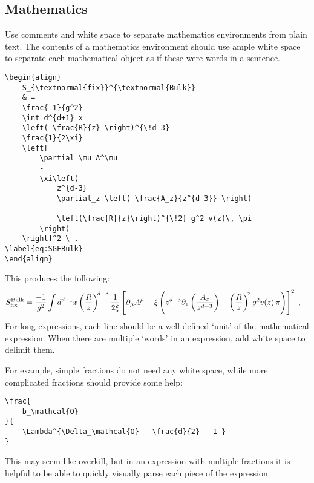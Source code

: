 \subsection{Mathematics}

Use comments and white space to separate mathematics environments from plain text.
% 
The contents of a mathematics environment should use ample white space to separate each mathematical object as if these were words in a sentence.
% 
\begin{lstlisting}[style=latexstyle]
\begin{align}
	S_{\textnormal{fix}}^{\textnormal{Bulk}}
	& =
	\frac{-1}{g^2} 
	\int d^{d+1} x  
	\left( \frac{R}{z} \right)^{\!d-3}
	\frac{1}{2\xi}
	\left[
	    \partial_\mu A^\mu
	    -
	    \xi\left( 
	        z^{d-3} 
	        \partial_z \left( \frac{A_z}{z^{d-3}} \right)
	        -
	        \left(\frac{R}{z}\right)^{\!2} g^2 v(z)\, \pi
	    \right)
	\right]^2 \ ,
\label{eq:SGFBulk}
\end{align}
\end{lstlisting}
% 
This produces the following:
\begin{align}
	S_{\textnormal{fix}}^{\textnormal{Bulk}}
	& =
	\frac{-1}{g^2} 
	\int d^{d+1} x  
	\left( \frac{R}{z} \right)^{\!d-3}\frac{1}{2\xi}
	\left[
	    \partial_\mu A^\mu
	    -
	    \xi\left( 
	        z^{d-3} \partial_z \left(\frac{A_z}{z^{d-3}}\right)
	        -
	        \left(\frac{R}{z}\right)^{\!2} g^2 v(z)\, \pi
	    \right)
	\right]^2 \ ,
\end{align}
For long expressions, each line should be a well-defined `unit' of the mathematical expression. When there are multiple `words' in an expression, add white space to delimit them. 

For example, simple fractions do not need any white space, while more complicated fractions should provide some help:
% 
\begin{lstlisting}[style=latexstyle]
\frac{ 
	b_\mathcal{O}
}{
	\Lambda^{\Delta_\mathcal{O} - \frac{d}{2} - 1 }
} 
\end{lstlisting}
% 
This may seem like overkill, but in an expression with multiple fractions it is helpful to be able to quickly visually parse each piece of the expression.


